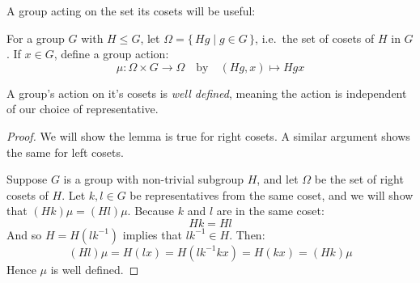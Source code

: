 A group acting on the set its cosets will be useful:

\begin{definition}
    \raggedright
    For a group \(G\) with \(H \leqslant G\), let \(\Omega = \{\,Hg \mid g \in G\,\}\), i.e.\ the set of cosets of \(H\)
    in \(G\).
    If \(x \in G\), define a group action:
    \[\mu:\Omega \times G \to \Omega \quad \text{by} \quad (Hg, x) \mapsto Hgx\]
\end{definition}

\begin{lemma}
    \raggedright
    A group's action on it's cosets is \emph{well defined}, meaning the action is independent of our choice of
    representative.
\end{lemma}

\begin{proof}
    We will show the lemma is true for right cosets.
    A similar argument shows the same for left cosets.

    Suppose \(G\) is a group with non-trivial subgroup \(H\), and let \(\Omega\) be the set of right cosets of \(H\).
    Let \(k,l \in G\) be representatives from the same coset, and we will show that \((Hk)\mu = (Hl)\mu\).
    Because \(k\) and \(l\) are in the same coset:
    \[ Hk = Hl \]
    And so \(H = H(lk^{-1})\) implies that \(lk^{-1} \in H\).
    Then:
    \[ (Hl)\mu = H(lx) = H(lk^{-1}kx) = H(kx) = (Hk)\mu \]
    Hence \(\mu\) is well defined.
\end{proof}

